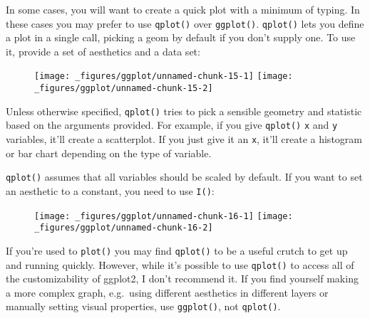 In some cases, you will want to create a quick plot with a minimum of
typing. In these cases you may prefer to use \texttt{qplot()} over
\texttt{ggplot()}. \texttt{qplot()} lets you define a plot in a single
call, picking a geom by default if you don't supply one. To use it,
provide a set of aesthetics and a data set: 

\begin{Shaded}
\begin{Highlighting}[]
\end{Highlighting}
\end{Shaded}

\begin{figure}[H]
  \texttt{[image: \_figures/ggplot/unnamed-chunk-15-1]}%
  \texttt{[image: \_figures/ggplot/unnamed-chunk-15-2]}
\end{figure}

Unless otherwise specified, \texttt{qplot()} tries to pick a sensible
geometry and statistic based on the arguments provided. For example, if
you give \texttt{qplot()} \texttt{x} and \texttt{y} variables, it'll
create a scatterplot. If you just give it an \texttt{x}, it'll create a
histogram or bar chart depending on the type of variable.

\texttt{qplot()} assumes that all variables should be scaled by default.
If you want to set an aesthetic to a constant, you need to use
\texttt{I()}: 

\begin{Shaded}
\begin{Highlighting}[]
 \NormalTok{)}
 \NormalTok{(}\NormalTok{))}
\end{Highlighting}
\end{Shaded}

\begin{figure}[H]
  \texttt{[image: \_figures/ggplot/unnamed-chunk-16-1]}%
  \texttt{[image: \_figures/ggplot/unnamed-chunk-16-2]}
\end{figure}

If you're used to \texttt{plot()} you may find \texttt{qplot()} to be a
useful crutch to get up and running quickly. However, while it's
possible to use \texttt{qplot()} to access all of the customizability of
ggplot2, I don't recommend it. If you find yourself making a more
complex graph, e.g.~using different aesthetics in different layers or
manually setting visual properties, use \texttt{ggplot()}, not
\texttt{qplot()}.
